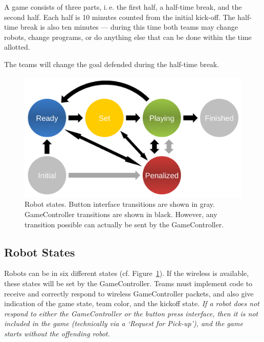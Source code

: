 \documentclass[12pt]{article}
\newcommand{\ie}{\mbox{i.\,e.}\xspace}
\newcommand{\cf}{\mbox{cf.}\xspace}
\begin{document}
A game consists of three parts, \ie the first half, a half-time break, and the second half. Each half is 10 minutes counted from the initial kick-off. The half-time break is also ten minutes --- during this time both teams may change robots, change programs, or do anything else that can be done within the time allotted. 

The teams will change the goal defended during the half-time break.

\begin{figure}[t]
\centerline{\includegraphics[width=0.9\columnwidth]{figs/states.pdf}}
\caption{Robot states. Button interface transitions are shown in gray. GameController transitions are shown in black. However, any transition possible can actually be sent by the GameController.}
\label{fig:robot_states}
\end{figure}

\subsection{Robot States}
\label{sec:robot_states}

Robots can be in six different states (\cf Figure~\ref{fig:robot_states}). If the wireless is available, these states will be set by the GameController. Teams must implement code to receive and correctly respond to wireless GameController packets, and also give indication of the game state, team color, and the kickoff state.
\emph{If a robot does not respond to either the GameController or the button press interface, then it is not included in the game (technically via a `Request for Pick-up'), and the game starts without the offending robot.}
\end{document}

